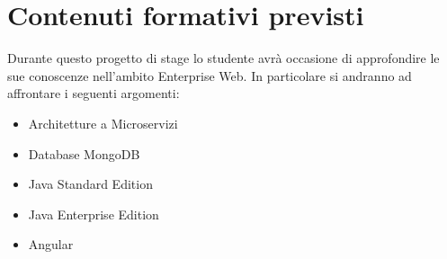 \section*{Contenuti formativi previsti}
Durante questo progetto di stage lo studente avrà occasione di approfondire le sue conoscenze nell’ambito Enterprise Web. In particolare si andranno ad affrontare i seguenti argomenti:
\begin{itemize}
    \item Architetture a Microservizi
    \item Database MongoDB
    \item Java Standard Edition
    \item Java Enterprise Edition
    \item Angular
\end{itemize}
\newpage
